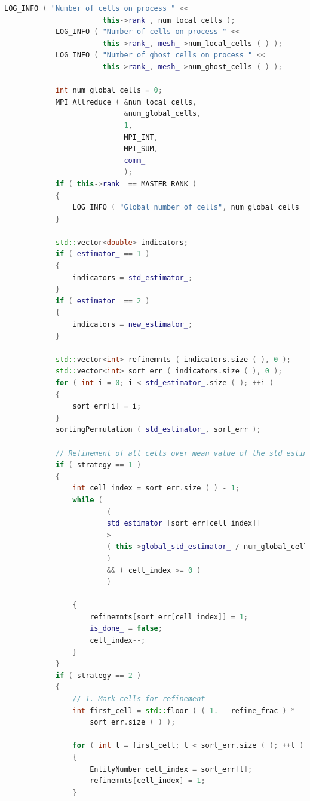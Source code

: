 \documentclass[a4paper, 11pt, twoside]{article}
\begin{document}
\begin{lstlisting}[language=C++, basicstyle={\footnotesize, \ttfamily}, keywordstyle=\color{blue}, numbers=none, tabsize=4]
            LOG_INFO ( "Number of cells on process " << 
                       this->rank_, num_local_cells );
            LOG_INFO ( "Number of cells on process " << 
                       this->rank_, mesh_->num_local_cells ( ) );
            LOG_INFO ( "Number of ghost cells on process " << 
                       this->rank_, mesh_->num_ghost_cells ( ) );

            int num_global_cells = 0;
            MPI_Allreduce ( &num_local_cells,
                            &num_global_cells,
                            1,
                            MPI_INT,
                            MPI_SUM,
                            comm_
                            );
            if ( this->rank_ == MASTER_RANK )
            {
                LOG_INFO ( "Global number of cells", num_global_cells );
            }

            std::vector<double> indicators;
            if ( estimator_ == 1 )
            {
                indicators = std_estimator_;
            }
            if ( estimator_ == 2 )
            {
                indicators = new_estimator_;
            }

            std::vector<int> refinemnts ( indicators.size ( ), 0 );
            std::vector<int> sort_err ( indicators.size ( ), 0 );
            for ( int i = 0; i < std_estimator_.size ( ); ++i )
            {
                sort_err[i] = i;
            }
            sortingPermutation ( std_estimator_, sort_err );

            // Refinement of all cells over mean value of the std estimator
            if ( strategy == 1 )
            {
                int cell_index = sort_err.size ( ) - 1;
                while (
                        (
                        std_estimator_[sort_err[cell_index]]
                        >
                        ( this->global_std_estimator_ / num_global_cells )
                        )
                        && ( cell_index >= 0 )
                        )

                {
                    refinemnts[sort_err[cell_index]] = 1;
                    is_done_ = false;
                    cell_index--;
                }
            }
            if ( strategy == 2 )
            {
                // 1. Mark cells for refinement
                int first_cell = std::floor ( ( 1. - refine_frac ) * 
                    sort_err.size ( ) );

                for ( int l = first_cell; l < sort_err.size ( ); ++l )
                {
                    EntityNumber cell_index = sort_err[l];
                    refinemnts[cell_index] = 1;
                }


\end{lstlisting}
\end{document}
